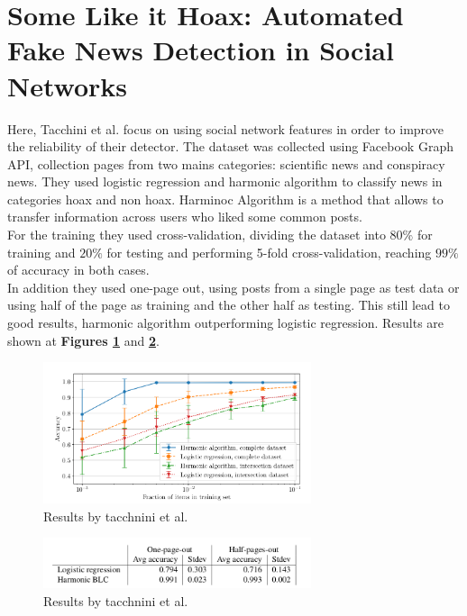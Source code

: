 \section{Some Like it Hoax: Automated Fake News Detection in Social Networks \cite{Tacchini2017}}
Here, Tacchini et al. focus on using social network features in order to improve the reliability of their detector. The dataset was collected using Facebook Graph API, collection pages from two mains categories: scientific news and conspiracy news. They used logistic regression and harmonic algorithm\cite{NIPS2011_4396} to classify news in categories hoax and non hoax. Harminoc Algorithm is a method that allows to transfer information across users who liked some common posts. \\

For the training they used cross-validation, dividing the dataset into $80\%$ for training and $20\%$ for testing and performing 5-fold cross-validation, reaching $99\%$ of accuracy in both cases. \\

In addition they used one-page out, using posts from a single page as test data or using half of the page as training and the other half as testing. This still lead to good results, harmonic algorithm outperforming logistic regression. Results are shown at \textbf{Figures \ref{fig:chap1:tacchini}} and \textbf{\ref{fig:chap1:tacchini2}}. \\


\begin{figure}[h]
	\centering
	\includegraphics[width=0.7\textwidth]{images/chap1_bis/rev4.png}
	\caption{Results by tacchnini et al. }
	\label{fig:chap1:tacchini}
\end{figure}

\begin{figure}[h]
	\centering
	\includegraphics[width=0.7\textwidth]{images/chap1_bis/rev5.png}
	\caption{Results by tacchnini et al. }
	\label{fig:chap1:tacchini2}
\end{figure}